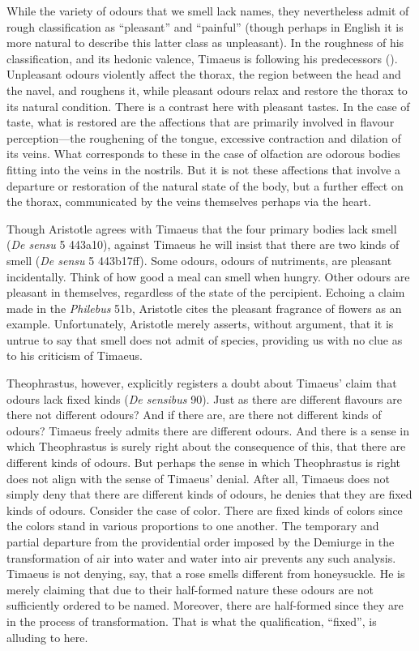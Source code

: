 While the variety of odours that we smell lack names, they nevertheless admit of rough classification as ``pleasant'' and ``painful'' (though perhaps in English it is more natural to describe this latter class as unpleasant). In the roughness of his classification, and its hedonic valence, Timaeus is following his predecessors (\citealt{Baltussen:2015aa}). Unpleasant odours violently affect the thorax, the region between the head and the navel, and roughens it, while pleasant odours relax and restore the thorax to its natural condition. There is a contrast here with pleasant tastes. In the case of taste, what is restored are the affections that are primarily involved in flavour perception---the roughening of the tongue, excessive contraction and dilation of its veins. What corresponds to these in the case of olfaction are odorous bodies fitting into the veins in the nostrils. But it is not these affections that involve a departure or restoration of the natural state of the body, but a further effect on the thorax, communicated by the veins themselves perhaps via the heart.

Though Aristotle agrees with Timaeus that the four primary bodies lack smell (\emph{De sensu} 5 443a10), against Timaeus he will insist that there are two kinds of smell (\emph{De sensu} 5 443b17ff). Some odours, odours of nutriments, are pleasant incidentally. Think of how good a meal can smell when hungry. Other odours are pleasant in themselves, regardless of the state of the percipient. Echoing a claim made in the \emph{Philebus} 51b, Aristotle cites the pleasant fragrance of flowers as an example. Unfortunately, Aristotle merely asserts, without argument, that it is untrue to say that smell does not admit of species, providing us with no clue as to his criticism of Timaeus. 

Theophrastus, however, explicitly registers a doubt about Timaeus' claim that odours lack fixed kinds (\emph{De sensibus} 90). Just as there are different flavours are there not different odours? And if there are, are there not different kinds of odours? Timaeus freely admits there are different odours. And there is a sense in which Theophrastus is surely right about the consequence of this, that there are different kinds of odours. But perhaps the sense in which Theophrastus is right does not align with the sense of Timaeus' denial. After all, Timaeus does not simply deny that there are different kinds of odours, he denies that they are fixed kinds of odours. Consider the case of color. There are fixed kinds of colors since the colors stand in various proportions to one another. The temporary and partial departure from the providential order imposed by the Demiurge in the transformation of air into water and water into air prevents any such analysis. Timaeus is not denying, say, that a rose smells different from honeysuckle. He is merely claiming that due to their half-formed nature these odours are not sufficiently ordered to be named. Moreover, there are half-formed since they are in the process of transformation. That is what the qualification, ``fixed'', is alluding to here.


